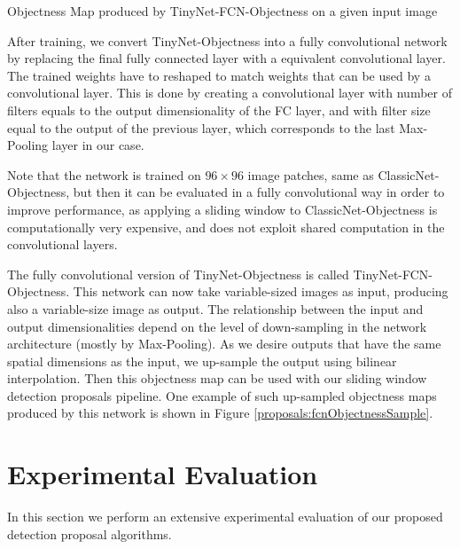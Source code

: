 \begin{marginfigure}[0.5cm]
	\centering
	\vspace*{0.5cm}
	\caption{Objectness Map produced by TinyNet-FCN-Objectness on a given input image}
	\label{proposals:fcnObjectnessSample}
\end{marginfigure}

After training, we convert TinyNet-Objectness into a fully convolutional network by replacing the final fully connected layer with a equivalent convolutional layer. The trained weights have to reshaped to match weights that can be used by a convolutional layer. This is done by creating a convolutional layer with number of filters equals to the output dimensionality of the FC layer, and with filter size equal to the output of the previous layer, which corresponds to the last Max-Pooling layer in our case.

Note that the network is trained on $96 \times 96$ image patches, same as ClassicNet-Objectness, but then it can be evaluated in a fully convolutional way in order to improve performance, as applying a sliding window to ClassicNet-Objectness is computationally very expensive, and does not exploit shared computation in the convolutional layers.

The fully convolutional version of TinyNet-Objectness is called TinyNet-FCN-Objectness. This network can now take variable-sized images as input, producing also a variable-size image as output. The relationship between the input and output dimensionalities depend on the level of down-sampling in the network architecture (mostly by Max-Pooling). As we desire outputs that have the same spatial dimensions as the input, we up-sample the output using bilinear interpolation. Then this objectness map can be used with our sliding window detection proposals pipeline. One example of such up-sampled objectness maps produced by this network is shown in Figure \ref{proposals:fcnObjectnessSample}.

\section{Experimental Evaluation}

In this section we perform an extensive experimental evaluation of our proposed detection proposal algorithms.

